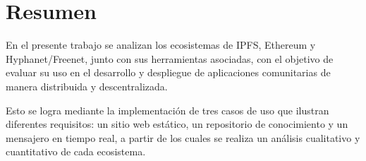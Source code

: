 \section{Resumen}

En el presente trabajo se analizan los ecosistemas de IPFS, Ethereum y Hyphanet/Freenet, junto con sus herramientas asociadas, con el objetivo de evaluar su uso en el desarrollo y despliegue de aplicaciones comunitarias de manera distribuida y descentralizada.

Esto se logra mediante la implementación de tres casos de uso que ilustran diferentes requisitos: un sitio web estático, un repositorio de conocimiento y un mensajero en tiempo real, a partir de los cuales se realiza un análisis cualitativo y cuantitativo de cada ecosistema.